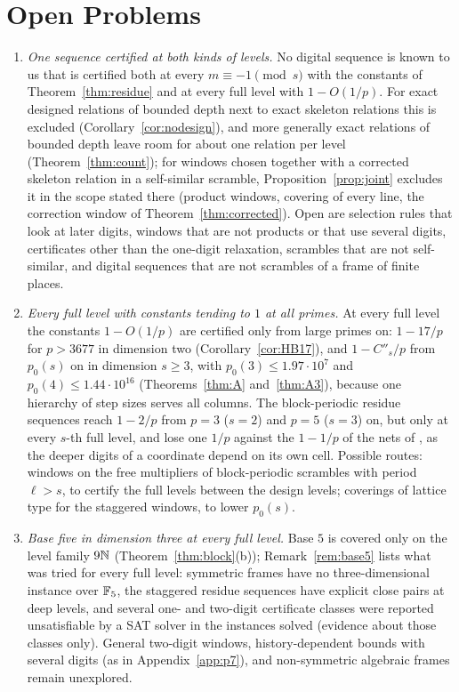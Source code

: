%
%
%
%
\section{Open Problems}\label{sec:open}
\begin{enumerate}
\item \emph{One sequence certified at both kinds of levels.} No digital sequence is known to us that is certified both at every $m\equiv-1\pmod s$ with the constants of Theorem~\ref{thm:residue} and at every full level with $1-O(1/p)$. For exact designed relations of bounded depth next to exact skeleton relations this is excluded (Corollary~\ref{cor:nodesign}), and more generally exact relations of bounded depth leave room for about one relation per level (Theorem~\ref{thm:count}); for windows chosen together with a corrected skeleton relation in a self-similar scramble, Proposition~\ref{prop:joint} excludes it in the scope stated there (product windows, covering of every line, the correction window of Theorem~\ref{thm:corrected}). Open are selection rules that look at later digits, windows that are not products or that use several digits, certificates other than the one-digit relaxation, scrambles that are not self-similar, and digital sequences that are not scrambles of a frame of finite places.
\item \emph{Every full level with constants tending to $1$ at all primes.} At every full level the constants $1-O(1/p)$ are certified only from large primes on: $1-17/p$ for $p>3677$ in dimension two (Corollary~\ref{cor:HB17}), and $1-C''_s/p$ from $p_0(s)$ on in dimension $s\ge3$, with $p_0(3)\le1.97\cdot10^7$ and $p_0(4)\le1.44\cdot10^{16}$ (Theorems~\ref{thm:A} and~\ref{thm:A3}), because one hierarchy of step sizes serves all columns. The block-periodic residue sequences reach $1-2/p$ from $p=3$ ($s=2$) and $p=5$ ($s=3$) on, but only at every $s$-th full level, and lose one $1/p$ against the $1-1/p$ of the nets of \cite{Gru26geo}%
, as the deeper digits of a coordinate depend on its own cell. Possible routes: windows on the free multipliers of block-periodic scrambles with period $\ell>s$, to certify the full levels between the design levels; coverings of lattice type for the staggered windows, to lower $p_0(s)$.
\item \emph{Base five in dimension three at every full level.} Base $5$ is covered only on the level family $9\mathbb{N}$ (Theorem~\ref{thm:block}(b)); Remark~\ref{rem:base5} lists what was tried for every full level: symmetric frames have no three-dimensional instance over $\mathbb{F}_5$, the staggered residue sequences have explicit close pairs at deep levels, and several one- and two-digit certificate classes were reported unsatisfiable by a SAT solver in the instances solved (evidence about those classes only). General two-digit windows, history-dependent bounds with several digits (as in Appendix~\ref{app:p7}), and non-symmetric algebraic frames remain unexplored.

\end{enumerate}
